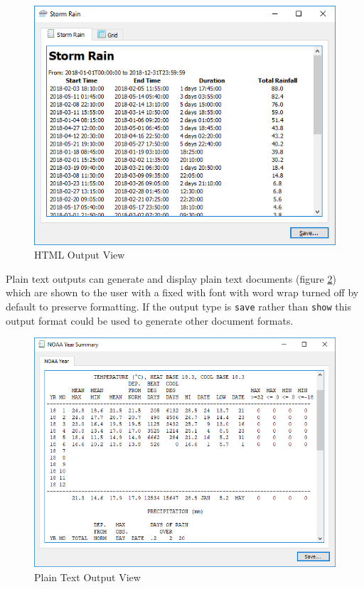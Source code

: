 \documentclass[a4paper,10pt]{book}
\begin{document}
\begin {figure}[!ht]
 \centering
 \includegraphics[scale=0.5]{images/html_output}
 \caption{HTML Output View}
 \label{img_html_output}
\end {figure}

Plain text outputs can generate and display plain text documents (figure \ref{img_text_output}) which are shown to the user with a fixed with font with word wrap turned off by default to preserve formatting. If the output type is \verb|save| rather than \verb|show| this output format could be used to generate other document formats. 

\begin {figure}[!ht]
 \centering
 \includegraphics[scale=0.5]{images/text_output}
 \caption{Plain Text Output View}
 \label{img_text_output}
\end {figure}
\end{document}
